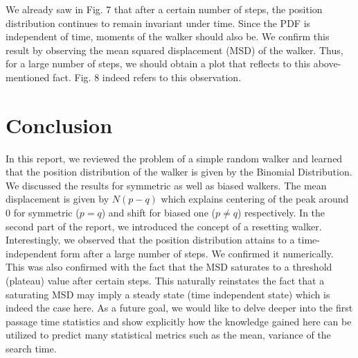 \documentclass[showpacs,amsmath,amssymb,aps,pre,twocolumn]{revtex4-1}
\begin{document}
We already saw in Fig. 7 that after a certain number of steps, the position distribution continues to remain invariant under time. Since the PDF is independent of time, moments of the walker should also be. We confirm this result by observing the mean squared displacement (MSD) of the walker. Thus, for a large number of steps, we should obtain a plot that reflects to this above-mentioned fact. Fig. 8 indeed refers to this observation. 




\section{Conclusion}
{
In this report, we 
reviewed the problem of a simple random walker and learned that the position distribution of the walker is given by the Binomial Distribution. We discussed the results for symmetric as well as biased walkers. The mean displacement is given by $N(p-q)$ which explains centering of the peak around $0$ for symmetric ($p=q$) and shift for biased one ($p \neq q$) respectively.
}
{
In the second part of the report, we introduced the concept of a resetting walker. Interestingly, we observed that the position distribution attains to a time-independent form after a large number of steps. We confirmed it numerically. This was also confirmed with the fact that the MSD saturates to a threshold (plateau) value after certain steps. This naturally reinstates the fact that a saturating MSD may imply a steady state (time independent state) which is indeed the case here. As a future goal, we would like to delve deeper into the first passage time statistics and show explicitly how the knowledge gained here can be utilized to predict many statistical metrics such as the mean, variance of the search time.
}
\end{document}
